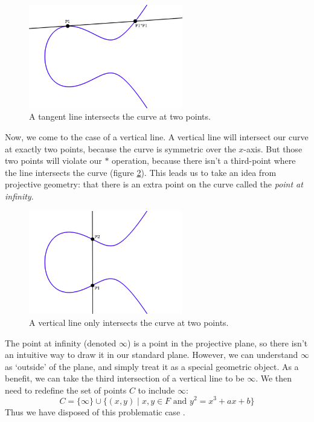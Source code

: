 \documentclass{article}
\begin{document}
\begin{figure}[h]
\centering
\includegraphics[width=0.6\textwidth]{images/ec4-tangent.png}
\caption{A tangent line intersects the curve at two points.}
\label{fig:ec-tangent}
\end{figure}

Now, we come to the case of a vertical line.
A vertical line will intersect our curve at exactly two points, because the curve is symmetric over the $x$-axis.
But those two points will violate our $*$ operation, because there isn't a third-point where the line intersects the curve (figure \ref{fig:ec-infinity}).
This leads us to take an idea from projective geometry: that there is an extra point on the curve called the \textit{point at infinity}.

\begin{figure}[h]
\centering
\includegraphics[width=0.6\textwidth]{images/ec4-infinity.png}
\caption{A vertical line only intersects the curve at two points.}
\label{fig:ec-infinity}
\end{figure}

The point at infinity (denoted $\infty$) is a point in the projective plane, so there isn't an intuitive way to draw it in our standard plane.
However, we can understand $\infty$ as `outside' of the plane, and simply treat it as a special geometric object.
As a benefit, we can take the third intersection of a vertical line to be $\infty$.
We then need to redefine the set of points $C$ to include $\infty$:
$$C = \{\infty\} \cup \{(x,y) \mid x,y \in F \text{ and } y^2 = x^3 + ax + b\}$$
Thus we have disposed of this problematic case \cite[$\S$2.2]{washington}.
\end{document}
